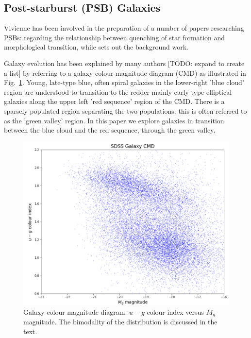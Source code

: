 \subsection{Post-starburst (PSB) Galaxies}
\label{sec:PSBs}
Vivienne has been involved in the preparation of a number of papers researching PSBs: \citet{2017MNRAS.472.1401A} regarding the relationship between quenching of star formation and morphological transition, while \citet{2016MNRAS.463..832W} sets out the background work.
\par Galaxy evolution has been explained by many authors [TODO: expand to create a list] \citep{baldry2004quantifying,2006MNRAS.373..469B} by referring to a galaxy colour-magnitude diagram (CMD) as illustrated in Fig.~\ref{fig:CMD1}. Young, late-type blue, often spiral galaxies in the lower-right 'blue cloud' region are understood to transition to the redder mainly early-type elliptical galaxies along the upper left 'red sequence' region of the CMD. There is a sparsely populated region separating the two populations: this is often referred to as the 'green valley' region. In this paper we explore galaxies in transition between the blue cloud and the red sequence, through the green valley.

\begin{figure}
	\includegraphics[width=\columnwidth]{images/CMDs/galaxyCMD.PNG}
    \caption{Galaxy colour-magnitude diagram: $u-g$ colour index versus $M_g$ magnitude. The bimodality of the distribution is discussed in the text.}
    \label{fig:CMD1}
\end{figure}